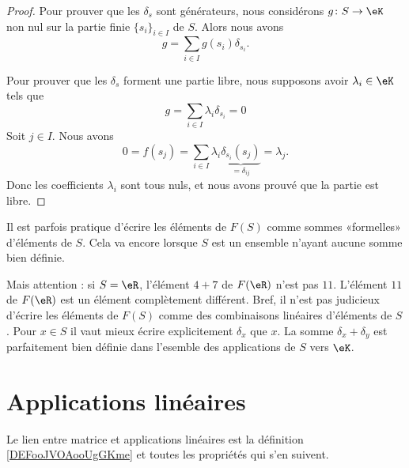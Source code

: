 \begin{proof}
	Pour prouver que les \( \delta_s\) sont générateurs, nous considérons \( g\colon S\to \eK\) non nul sur la partie finie \( \{ s_i \}_{i\in I}\) de \( S\). Alors nous avons
	\begin{equation}
		g=\sum_{i\in I}g(s_i)\delta_{s_i}.
	\end{equation}

	Pour prouver que les \( \delta_s\) forment une partie libre, nous supposons avoir \( \lambda_i\in \eK\) tels que
	\begin{equation}
		g=\sum_{i\in I}\lambda_i\delta_{s_i}=0
	\end{equation}
	Soit \( j\in I\). Nous avons
	\begin{equation}
		0=f(s_j)=\sum_{i\in I}\lambda_i \underbrace{\delta_{s_i}(s_j)}_{=\delta_{ij}}=\lambda_j.
	\end{equation}
	Donc les coefficients \( \lambda_i\) sont tous nuls, et nous avons prouvé que la partie est libre.
\end{proof}

Il est parfois pratique d'écrire les éléments de \( F(S)\) comme sommes «formelles» d'éléments de \( S\). Cela va encore lorsque \( S\) est un ensemble n'ayant aucune somme bien définie.

Mais attention : si \( S=\eR\), l'élément \( 4+7\) de \( F(\eR)\) n'est pas \( 11\). L'élément \( 11\) de \( F(\eR)\) est un élément complètement différent. Bref, il n'est pas judicieux d'écrire les éléments de \( F(S)\) comme des combinaisons linéaires d'éléments de \( S\). Pour \( x\in S\) il vaut mieux écrire explicitement \( \delta_x\) que \( x\). La somme \( \delta_x+\delta_y\) est parfaitement bien définie dans l'esemble des applications de \( S\) vers \( \eK\).

\section{Applications linéaires}

Le lien entre matrice et applications linéaires est la définition \ref{DEFooJVOAooUgGKme} et toutes les propriétés qui s'en suivent.

